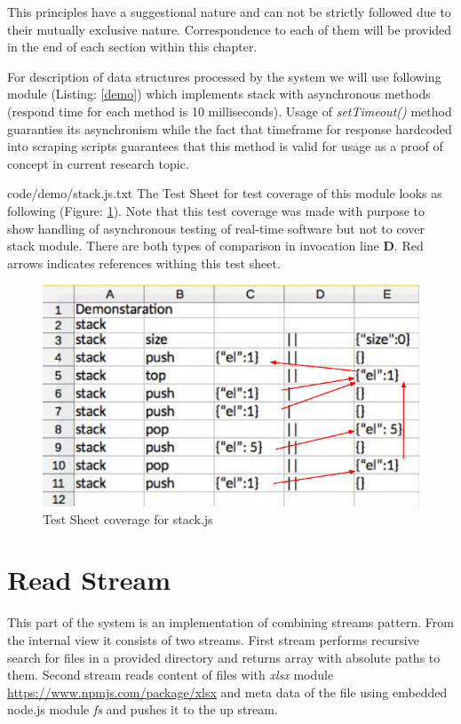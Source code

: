 This principles have a suggestional nature and can not be strictly followed due to their mutually exclusive nature. Correspondence to each of them will be provided in the end of each section within this chapter.

For description of data structures processed by the system we will use following module (Listing: \ref{demo}) which implements stack with asynchronous methods (respond time for each method is 10 milliseconds). Usage of \textit{setTimeout()} method guaranties its asynchronism while the fact that timeframe for response hardcoded into scraping scripts guarantees that this method is valid for usage as a proof of concept in current research topic.

{code/demo/stack.js.txt}
The Test Sheet for test coverage of this module looks as following (Figure: \ref{fig:demoTS}). Note that this test coverage was made with purpose to show handling of asynchronous testing of real-time software but not to cover stack module. There are both types of comparison in invocation line \textbf{D}. Red arrows indicates references withing this test sheet.
\begin{figure}[H]
\centering
\includegraphics[width=\linewidth]{grafiken/demoTS.pdf}
\caption{Test Sheet coverage for stack.js}
\label{fig:demoTS}
\end{figure}



\section{Read Stream}

This part of the system is an implementation of combining streams pattern. From the internal view it consists of two streams. First stream performs recursive search for files in a provided directory and returns array with absolute paths to them. Second stream reads content of files with \textit{xlsx} module \url{https://www.npmjs.com/package/xlsx} and meta data of the file using embedded node.js module \textit{fs} and pushes it to the up stream.

